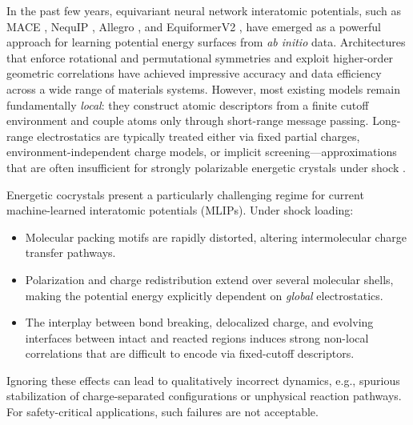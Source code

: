 \documentclass{article}
\begin{document}
In the past few years, equivariant neural network interatomic potentials, such as MACE \cite{batatia2022mace,batatia2023foundation}, NequIP \cite{batzner20223}, Allegro \cite{musaelian2023learning}, and EquiformerV2 \cite{liao2023equiformer}, have emerged as a powerful approach for learning potential energy surfaces from \emph{ab initio} data. Architectures that enforce rotational and permutational symmetries and exploit higher-order geometric correlations have achieved impressive accuracy and data efficiency across a wide range of materials systems. However, most existing models remain fundamentally \emph{local}: they construct atomic descriptors from a finite cutoff environment and couple atoms only through short-range message passing. Long-range electrostatics are typically treated either via fixed partial charges, environment-independent charge models, or implicit screening---approximations that are often insufficient for strongly polarizable energetic crystals under shock \cite{valeeswaran2023charge,anstine2023cocrystal}.

Energetic cocrystals present a particularly challenging regime for current machine-learned interatomic potentials (MLIPs). Under shock loading:
\begin{itemize}
    \item Molecular packing motifs are rapidly distorted, altering intermolecular charge transfer pathways.
    \item Polarization and charge redistribution extend over several molecular shells, making the potential energy explicitly dependent on \emph{global} electrostatics.
    \item The interplay between bond breaking, delocalized charge, and evolving interfaces between intact and reacted regions induces strong non-local correlations that are difficult to encode via fixed-cutoff descriptors.
\end{itemize}

Ignoring these effects can lead to qualitatively incorrect dynamics, e.g., spurious stabilization of charge-separated configurations or unphysical reaction pathways. For safety-critical applications, such failures are not acceptable.
\end{document}
